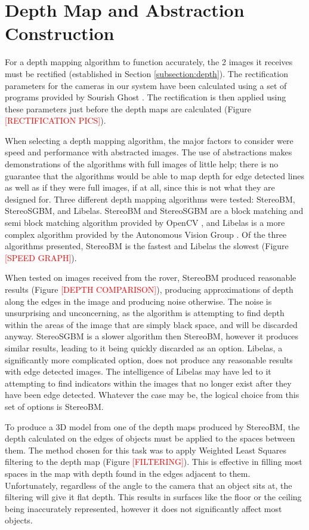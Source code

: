 \section{Depth Map and Abstraction Construction}

For a depth mapping algorithm to function accurately, the 2 images it receives must be rectified (established in Section \ref{subsection:depth}). The rectification parameters for the cameras in our system have been calculated using a set of programs provided by Sourish Ghost \cite{calibgit}. The rectification is then applied using these parameters just before the depth maps are calculated (Figure \textcolor{red}{[RECTIFICATION PICS]}).

When selecting a depth mapping algorithm, the major factors to consider were speed and performance with abstracted images. The use of abstractions makes demonstrations of the algorithms with full images of little help; there is no guarantee that the algorithms would be able to map depth for edge detected lines as well as if they were full images, if at all, since this is not what they are designed for. Three different depth mapping algorithms were tested: StereoBM, StereoSGBM, and Libelas. StereoBM and StereoSGBM are a block matching and semi block matching algorithm provided by OpenCV \cite{OpenCV}, and Libelas is a more complex algorithm provided by the Autonomous Vision Group \cite{geiger2010efficient}. Of the three algorithms presented, StereoBM is the fastest and Libelas the slowest (Figure \textcolor{red}{[SPEED GRAPH]}). 

When tested on images received from the rover, StereoBM produced reasonable results (Figure \textcolor{red}{[DEPTH COMPARISON]}), producing approximations of depth along the edges in the image and producing noise otherwise. The noise is unsurprising and unconcerning, as the algorithm is attempting to find depth within the areas of the image that are simply black space, and will be discarded anyway. StereoSGBM is a slower algorithm then StereoBM, however it produces similar results, leading to it being quickly discarded as an option. Libelas, a significantly more complicated option, does not produce any reasonable results with edge detected images. The intelligence of Libelas may have led to it attempting to find indicators within the images that no longer exist after they have been edge detected. Whatever the case may be, the logical choice from this set of options is StereoBM.

To produce a 3D model from one of the depth maps produced by StereoBM, the depth calculated on the edges of objects must be applied to the spaces between them. The method chosen for this task was to apply Weighted Least Squares filtering to the depth map (Figure \textcolor{red}{[FILTERING]}). This is effective in filling most spaces in the map with depth found in the edges adjacent to them. Unfortunately, regardless of the angle to the camera that an object sits at, the filtering will give it flat depth. This results in surfaces like the floor or the ceiling being inaccurately represented, however it does not significantly affect most objects.

